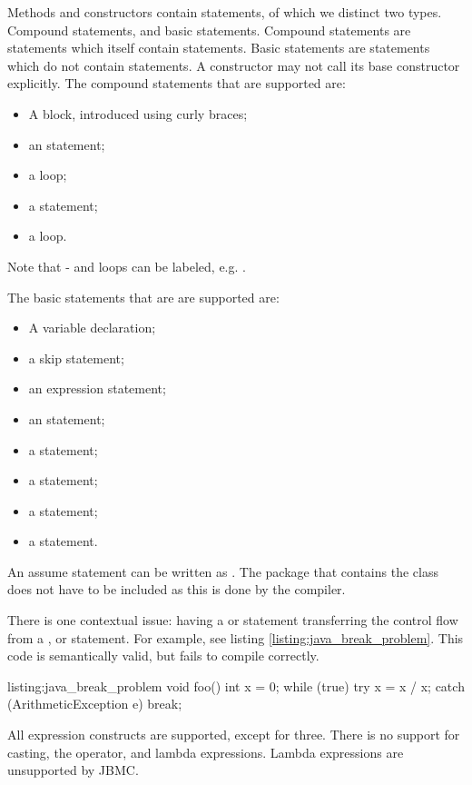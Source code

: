 Methods and constructors contain statements, of which we distinct two types. 
Compound statements, and basic statements. Compound statements are statements 
which itself contain statements. Basic statements are statements which do 
not contain statements. A constructor may not call its base constructor explicitly.
The compound statements that are supported are:

\begin{itemize}
    \item A block, introduced using curly braces;
    \item an  statement;
    \item a  loop;
    \item a  statement;
    \item a  loop.
\end{itemize}

Note that - and  loops can be labeled, e.g.
.

The basic statements that are are supported are:

\begin{multicols}{2}
    \begin{itemize}
        \item A variable declaration;
        \item a skip statement;
        \item an expression statement;
        \item an  statement;
        \item a  statement;
        \item a  statement;
        \item a  statement;
        \item a  statement.
\end{itemize}
\end{multicols}

An assume statement can be written as . The package
that contains the  class does not have to be included as this 
is done by the compiler.

There is one contextual issue: having a  or 
 statement transferring the control flow from a 
,  or  statement. For 
example, see listing \ref{listing:java_break_problem}. This code is semantically 
valid, but fails to compile correctly. 

\begin{Java}{listing:java_break_problem}{}
void foo() {
    int x = 0;
    while (true) {
        try {
            x = x / x;
        } catch (ArithmeticException e) {
            break;
        }
    }
}
\end{Java}

All expression constructs are supported, except for three. There is no support for 
casting, the  operator, and lambda expressions. Lambda 
expressions are unsupported by JBMC.
